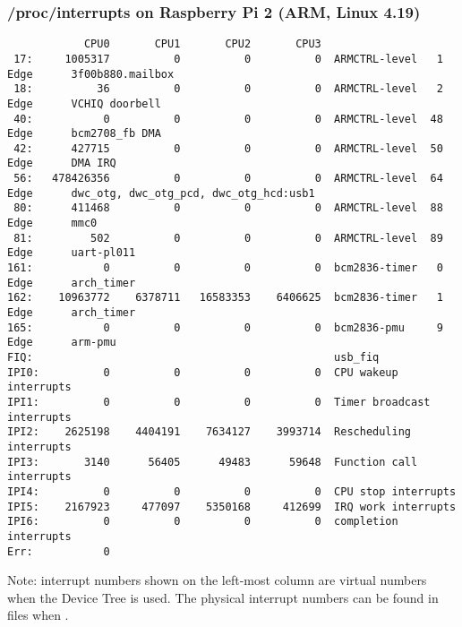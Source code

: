 \begin{frame}[fragile]
  \frametitle{/proc/interrupts on Raspberry Pi 2 (ARM, Linux 4.19)}
\begin{block}{}
  \tiny
\begin{verbatim}
            CPU0       CPU1       CPU2       CPU3
 17:     1005317          0          0          0  ARMCTRL-level   1 Edge      3f00b880.mailbox
 18:          36          0          0          0  ARMCTRL-level   2 Edge      VCHIQ doorbell
 40:           0          0          0          0  ARMCTRL-level  48 Edge      bcm2708_fb DMA
 42:      427715          0          0          0  ARMCTRL-level  50 Edge      DMA IRQ
 56:   478426356          0          0          0  ARMCTRL-level  64 Edge      dwc_otg, dwc_otg_pcd, dwc_otg_hcd:usb1
 80:      411468          0          0          0  ARMCTRL-level  88 Edge      mmc0
 81:         502          0          0          0  ARMCTRL-level  89 Edge      uart-pl011
161:           0          0          0          0  bcm2836-timer   0 Edge      arch_timer
162:    10963772    6378711   16583353    6406625  bcm2836-timer   1 Edge      arch_timer
165:           0          0          0          0  bcm2836-pmu     9 Edge      arm-pmu
FIQ:                                               usb_fiq
IPI0:          0          0          0          0  CPU wakeup interrupts
IPI1:          0          0          0          0  Timer broadcast interrupts
IPI2:    2625198    4404191    7634127    3993714  Rescheduling interrupts
IPI3:       3140      56405      49483      59648  Function call interrupts
IPI4:          0          0          0          0  CPU stop interrupts
IPI5:    2167923     477097    5350168     412699  IRQ work interrupts
IPI6:          0          0          0          0  completion interrupts
Err:           0
\end{verbatim}
\end{block}
  {\footnotesize
  Note: interrupt numbers shown on the left-most column are virtual
  numbers when the Device Tree is used. The physical interrupt
  numbers can be found in  files
  when .}
\end{frame}

